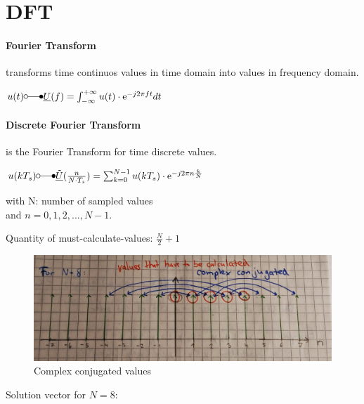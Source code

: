 \section{DFT}

\paragraph{Fourier Transform}
transforms time continuos values in time domain into values in frequency domain.

\(u(t) \laplace \underline{U}(f)=\int_{-\infty}^{+\infty}u(t) \cdot \euler^{-j 2 \pi f t} dt \)

\paragraph{Discrete Fourier Transform} 
is the Fourier Transform for time discrete values.

\( u(kT_s) \laplace  \underline{\tilde{U}}(\frac{n}{N \cdot T_s})= \sum_{k=0}^{N-1} u(kT_s) \cdot \euler^{-j 2 \pi n \frac{k}{N}} \)

with N: number of sampled values \\and \(n = 0, 1, 2, ... , N-1\).

Quantity of must-calculate-values: $\frac{N}{2} + 1$ 

\begin{figure}
	\centering
	\includegraphics[width=0.9\linewidth]{images_LA/mirrorValues}
	\caption{Complex conjugated values}
	\label{fig:mirrorValues}
\end{figure}

Solution vector for $N=8$:

